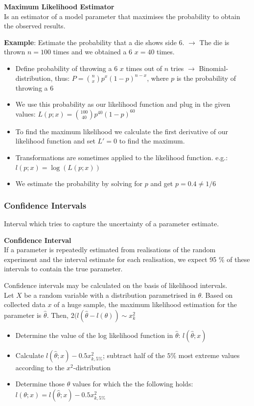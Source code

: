 \documentclass{article}
\begin{document}
\begin{multicols*}{3}
\begin{mdframed}[backgroundcolor=astral] 
    \textbf{Maximum Likelihood Estimator}\\
    Is an estimator of a model parameter that maximises the probability to obtain the observed results.
\end{mdframed}

\textbf{Example}: Estimate the probability that a die shows side 6. $\rightarrow$ The die is thrown $n = 100$ times and we obtained a 6 $x = 40$ times. 
\begin{itemize}
    \item Define probability of throwing a 6 $x$ times out of $n$ tries $\rightarrow$ Binomial-distribution, thus: $P = {n\choose x}p^x(1-p)^{n-x}$, where $p$ is the probability of throwing a 6
    \item We use this probability as our likelihood function and plug in the given values: $L(p;x) = {100\choose 40}p^{40}(1-p)^{60}$
    \item To find the maximum likelihood we calculate the first derivative of our likelihood function and set $L' = 0$ to find the maximum. 
    \item Transformations are sometimes applied to the likelihood function. e.g.: $l(p;x) = \log (L(p;x))$
    \item We estimate the probability by solving for $p$ and get $p = 0.4 \neq 1/6$
\end{itemize}

\subsubsection{Confidence Intervals}

Interval which tries to capture the uncertainty of a parameter estimate. 

\begin{mdframed}[backgroundcolor=astral] 
    \textbf{Confidence Interval}\\
    If a parameter is repeatedly estimated from realisations of the random experiment and the interval estimate for each realisation, we expect 95 \% of these intervals to contain the true parameter.
\end{mdframed}

Confidence intervals may be calculated on the basis of likelihood intervals.\\
Let $X$ be a random variable with a distribution parametrised in $\theta$. Based on collected data $x$ of a huge sample, the maximum likelihood estimation for the parameter is $\hat{\theta}$. Then, $2(l(\hat{\theta} - l(\theta)) \sim x^2_k$
\begin{itemize}
    \item Determine the value of the log likelihood function in $\hat{\theta}$: $l(\hat{\theta};x)$
    \item Calculate $l(\hat{\theta};x) - 0.5x^2_{k,5\%}$; subtract half of the $5\%$ most extreme values according to the $x^2$-distribution
    \item Determine those $\theta$ values for which the the following holds: 
    $l(\theta;x) = l(\hat{\theta};x) - 0.5x^2_{k,5\%}$
\end{itemize}


\end{multicols*}
\end{document}

